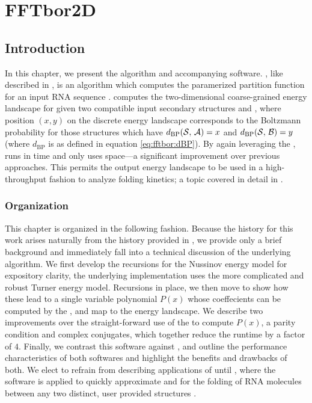 
\chapter{FFTbor2D}
\label{ch:ffttwo}


\section{Introduction}
\label{sec:ffttwo:intro}

In this chapter, we present the \ffttwo algorithm and accompanying software.
\ffttwo, like \fftbor described in , is an algorithm
which computes the paramerized partition function for an input RNA sequence
\seq. \ffttwo computes the two-dimensional coarse-grained energy landscape for \seq
given two compatible input secondary structures \strA and \strB, where position
$(x,y)$ on the discrete energy landscape corresponds to the Boltzmann
probability for those structures \str which have $d_{\text{BP}}(\mathcal S,\,\mathcal A)=x$ and
$d_{\text{BP}}(\mathcal S,\,\mathcal B)=y$ (where $d_{\text{BP}}$ is as defined in
equation \ref{eq:fftbor:dBP}). By again leveraging the \fft, \ffttwo runs in 
time and only uses  space---a significant improvement over previous
approaches. This permits the output energy landscape to be used in a
high-throughput fashion to analyze folding kinetics; a topic covered in detail
in .

\subsection{Organization}
\label{subsec:ffttwo:org}

This chapter is organized in the following fashion. Because the history for
this work arises naturally from the history provided in
, we provide only a brief background
and immediately fall into
a technical discussion of the underlying algorithm. We first develop the
recursions for the Nussinov energy model for expository clarity, the
underlying implementation uses the more complicated and robust Turner energy
model. Recursions in place, we then move to show how these lead to
a single variable polynomial $P(x)$ whose coeffecients can be computed by
the \idft, and map to the \twoD energy landscape. We describe two improvements over
the straight-forward use of the \fft to compute $P(x)$,
a parity condition and complex conjugates, which together reduce the
runtime by a factor of $4$. Finally, we contrast this software against \rnatwofold,
and outline the performance characteristics of both softwares and highlight
the benefits and drawbacks of both. We elect to refrain from describing
applications of \ffttwo until , where the software is
applied to quickly approximate \mfpt and \eqt for the folding of RNA molecules
between any two distinct, user provided structures \strAB.

